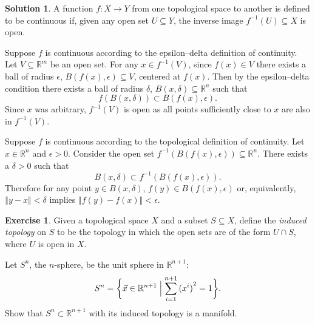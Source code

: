 \documentclass[11pt, a4paper]{article}
\newcommand*{\norm}[1]{\ensuremath{\left\Vert#1\right\Vert}}
\theoremstyle{definition}
\newtheorem{ex}{Exercise}[part]
\newtheorem{sol}{Solution}[part]
\begin{document}
\begin{sol}

A function $f: X \to Y$ from one topological space to another is defined to be continuous if, given any open set $U \subseteq Y$, the inverse image $f^{-1}(U) \subseteq X$ is open.

Suppose $f$ is continuous according to the epsilon--delta definition of continuity.
Let $V \subseteq \mathbb{R}^m$ be an open set.
For any $x \in f^{-1}(V)$, since $f(x) \in V$ there exists a ball of radius $\epsilon$, $B(f(x), \epsilon) \subseteq V$, centered at $f(x)$.
Then by the epsilon--delta condition there exists a ball of radius $\delta$, $B(x, \delta) \subseteq \mathbb{R}^n$ such that
\[
    f(B(x, \delta)) \subset B(f(x), \epsilon).
\]
Since $x$ was arbitrary, $f^{-1}(V)$ is open as all points sufficiently close to $x$ are also in $f^{-1}(V)$.

Suppose $f$ is continuous according to the topological definition of continuity.
Let $x \in \mathbb{R}^n$ and $\epsilon > 0$.
Consider the open set $f^{-1}(B(f(x), \epsilon)) \subseteq \mathbb{R}^n$.
There exists a $\delta > 0$ such that
\[
    B(x, \delta) \subset f^{-1}(B(f(x), \epsilon)).
\]
Therefore for any point $y \in B(x,\delta)$, $f(y) \in B(f(x), \epsilon)$ or, equivalently, $\norm{y - x} < \delta$ implies $\norm{f(y) - f(x)} < \epsilon$.

\end{sol}

\begin{ex}

Given a topological space $X$ and a subset $S \subseteq X$, define the \emph{induced topology} on $S$ to be the topology in which the open sets are of the form $U \cap S$, where $U$ is open in $X$.

Let $S^n$, the $n$-sphere, be the unit sphere in $\mathbb{R}^{n + 1}$:
\[
    S^n = \biggl\{\vec{x} \in \mathbb{R}^{n + 1} \Bigm| \sum_{i = 1}^{n + 1} {(x^i)}^2 = 1 \biggr\}.
\]
Show that $S^n \subset \mathbb{R}^{n + 1}$ with its induced topology is a manifold.

\end{ex}
\end{document}
